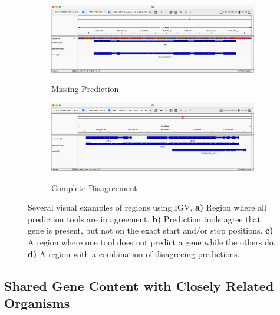 \begin{figure}[t]
  \ContinuedFloat
  \centering
  \begin{subfigure}{0.9\textwidth}
    \includegraphics[width=\textwidth]{figures/igv/igv-missing-thin.png}
    \label{fig:igv-missing}
    \caption{Missing Prediction}
  \end{subfigure}
  \begin{subfigure}{0.9\textwidth}
    \includegraphics[width=\textwidth]{figures/igv/igv-complicated-thin.png}
    \label{fig:igv-complicated}
    \caption{Complete Disagreement}
  \end{subfigure}
  \caption[Examples of Potential Regions]{Several visual examples of
    regions using IGV. \textbf{a)} Region where all prediction tools
    are in agreement. \textbf{b)} Prediction tools agree that gene is
    present, but not on the exact start and/or stop
    positions. \textbf{c)} A region where one tool does not predict a
    gene while the others do. \textbf{d)} A region with a combination
    of disagreeing predictions.}
  \label{fig:igv-cases}
\end{figure}

\subsection{Shared Gene Content with Closely Related Organisms}

